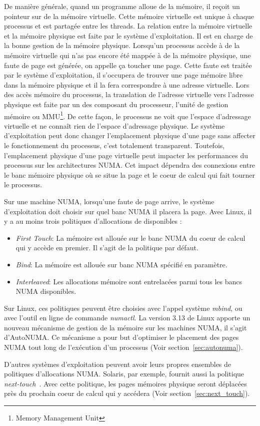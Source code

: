 De manière générale, quand un programme alloue de la mémoire, il reçoit un pointeur sur de la mémoire virtuelle.
%
Cette mémoire virtuelle est unique à chaque processus et est partagée entre les threads.
%
La relation entre la mémoire virtuelle et la mémoire physique est faite par le système d'exploitation.
%
Il est en charge de la bonne gestion de la mémoire physique.
%
Lorsqu'un processus accède à de la mémoire virtuelle qui n'as pas encore été mappée à de la mémoire physique, une faute de page est générée, on appelle ça toucher une page.
%
Cette faute est traitée par le système d'exploitation, il s'occupera de trouver une page mémoire libre dans la mémoire physique et il la fera correspondre à une adresse virtuelle.
%
Lors des accès mémoire du processus, la translation de l'adresse virtuelle vers l'adresse physique est faite par un des composant du processeur, l'unité de gestion mémoire ou MMU\footnote{Memory Management Unit}.
%
De cette façon, le processus ne voit que l'espace d'adressage virtuelle et ne connaît rien de l'espace d'adressage physique.
%
Le système d'exploitation peut donc changer l'emplacement physique d'une page sans affecter le fonctionnement du processus, c'est totalement transparent.
%
Toutefois, l'emplacement physique d'une page virtuelle peut impacter les performances du processus sur les architectures NUMA.
%
Cet impact dépendra des connexions entre le banc mémoire physique où se situe la page et le coeur de calcul qui fait tourner le processus.


Sur une machine NUMA, lorsqu'une faute de page arrive, le système d'exploitation doit choisir sur quel banc NUMA il placera la page.
%
Avec Linux, il y a au moins trois politiques d'allocations de disponibles :
\begin{itemize}
        \item {\em First Touch}: La mémoire est allouée sur le banc NUMA du coeur de calcul qui y accède en premier.
                         Il s'agit de la politique par défaut.
        \item {\em Bind}: La mémoire est allouée sur banc NUMA spécifié en paramètre.
        \item {\em Interleaved}: Les allocations mémoire sont entrelacées parmi tous les bancs NUMA disponibles.
\end{itemize}
Sur Linux, ces politiques peuvent être choisies avec l'appel système {\em mbind}, ou avec l'outil en ligne de commande {\em numactl}.
%
La version 3.13 de Linux apporte un nouveau mécanisme de gestion de la mémoire sur les machines NUMA, il s'agit d'AutoNUMA.
%
Ce mécanisme a pour but d'optimiser le placement des pages NUMA tout long de l'exécution d'un processus (Voir section~\ref{sec:autonuma}).


D'autres systèmes d'exploitation peuvent avoir leurs propres ensembles de politiques d'allocations NUMA.
%
Solaris, par exemple, fournit aussi la politique {\em next-touch}~\cite{next_touch}.
%
Avec cette politique, les pages mémoires physique seront déplacées près du prochain coeur de calcul qui y accédera (Voir section~\ref{sec:next_touch}).

